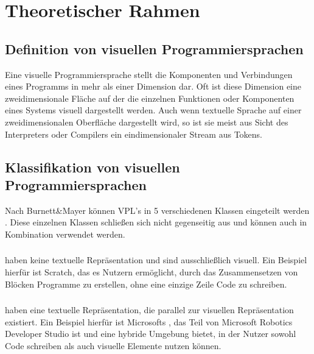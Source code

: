 \documentclass[ngerman]{article}
\begin{document}
\pagebreak

\section{Theoretischer Rahmen}

\subsection{Definition von visuellen Programmiersprachen}
Eine visuelle Programmiersprache stellt die Komponenten und Verbindungen eines Programms in mehr als einer Dimension dar. Oft ist diese Dimension eine zweidimensionale Fläche auf der die einzelnen Funktionen oder Komponenten eines Systems visuell dargestellt werden. 
Auch wenn textuelle Sprache auf einer zweidimensionalen Oberfläche dargestellt wird, so ist sie meist aus Sicht des Interpreters oder Compilers ein eindimensionaler Stream aus Tokens. \cite{Myers}

\subsection{Klassifikation von visuellen Programmiersprachen}

Nach Burnett\&Mayer können VPL's in 5 verschiedenen Klassen eingeteilt werden \cite{BURNETT1994287}. Diese einzelnen Klassen schließen sich nicht gegenseitig aus und können auch in Kombination verwendet werden.

\subsubsection{}
 haben keine textuelle Repräsentation und sind ausschließlich visuell. Ein Beispiel hierfür ist Scratch, das es Nutzern ermöglicht, durch das Zusammensetzen von Blöcken Programme zu erstellen, ohne eine einzige Zeile Code zu schreiben. \cite{mitScratchAbout}

\subsubsection{}
 haben eine textuelle Repräsentation, die parallel zur visuellen Repräsentation existiert. 
Ein Beispiel hierfür ist Microsofts , das Teil von Microsoft Robotics Developer Studio ist und eine hybride Umgebung bietet, in der Nutzer sowohl Code schreiben als auch visuelle Elemente nutzen können. \cite{microsoftIntroduction}
\end{document}

